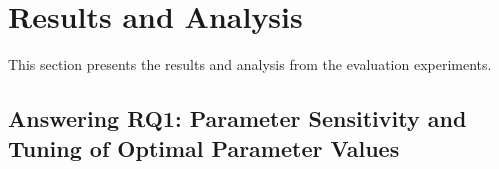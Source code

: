 \documentclass[sigconf,review, anonymous]{acmart}
\newcommand{\task}{218}
\begin{document}







\section{Results and Analysis}
\label{sec:result}
This section presents the results and analysis from the evaluation experiments.

\subsection{Answering RQ1: Parameter Sensitivity and Tuning of Optimal Parameter Values}
\label{subsec:RQ1}
\end{document}
